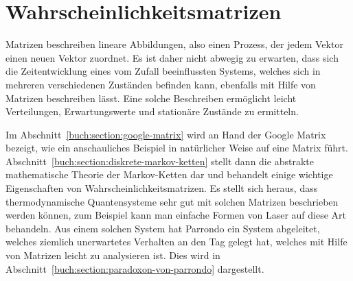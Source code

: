 %
%
%
\chapter{Wahrscheinlichkeitsmatrizen
\label{buch:chapter:wahrscheinlichkeit}}
\rhead{}
Matrizen beschreiben lineare Abbildungen, also einen Prozess, der
jedem Vektor einen neuen Vektor zuordnet.
Es ist daher nicht abwegig zu erwarten, dass sich 
die Zeitentwicklung eines vom Zufall beeinflussten Systems, welches sich
in mehreren verschiedenen Zuständen befinden kann, ebenfalls mit Hilfe
von Matrizen beschreiben lässt.
Eine solche Beschreiben ermöglicht leicht Verteilungen,
Erwartungswerte und stationäre Zustände zu ermitteln.

Im Abschnitt~\ref{buch:section:google-matrix} wird an Hand der Google
Matrix bezeigt, wie ein anschauliches Beispiel in natürlicher Weise
auf eine Matrix führt.
Abschnitt~\ref{buch:section:diskrete-markov-ketten} stellt dann die abstrakte
mathematische Theorie der Markov-Ketten dar und behandelt einige wichtige
Eigenschaften von Wahrscheinlichkeitsmatrizen.
Es stellt sich heraus, dass thermodynamische Quantensysteme sehr gut
mit solchen Matrizen beschrieben werden können, zum Beispiel kann man
einfache Formen von Laser auf diese Art behandeln.
Aus einem solchen System hat Parrondo ein System abgeleitet, welches 
ziemlich unerwartetes Verhalten an den Tag gelegt hat, welches mit
Hilfe von Matrizen leicht zu analysieren ist. 
Dies wird in Abschnitt~\ref{buch:section:paradoxon-von-parrondo}
dargestellt.





